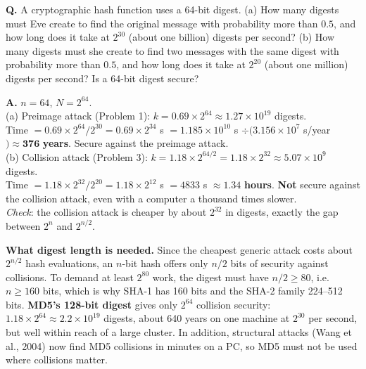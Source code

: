 \begin{worked}
\textbf{Q.} A cryptographic hash function uses a 64-bit digest. (a) How many digests must Eve create to find the original message with probability more than $0.5$, and how long does it take at $2^{30}$ (about one billion) digests per second? (b) How many digests must she create to find two messages with the same digest with probability more than $0.5$, and how long does it take at $2^{20}$ (about one million) digests per second? Is a 64-bit digest secure?

\textbf{A.} $n = 64$, $N = 2^{64}$.\\
(a) Preimage attack (Problem 1): $k = 0.69 \times 2^{64} \approx 1.27 \times 10^{19}$ digests.\\
Time $= 0.69 \times 2^{64} / 2^{30} = 0.69 \times 2^{34}$ s $= 1.185 \times 10^{10}$ s $\div (3.156 \times 10^{7}$ s/year$) \approx \mathbf{376}$ \textbf{years}. Secure against the preimage attack.\\
(b) Collision attack (Problem 3): $k = 1.18 \times 2^{64/2} = 1.18 \times 2^{32} \approx 5.07 \times 10^{9}$ digests.\\
Time $= 1.18 \times 2^{32} / 2^{20} = 1.18 \times 2^{12}$ s $= 4833$ s $\approx \mathbf{1.34}$ \textbf{hours}. \textbf{Not} secure against the collision attack, even with a computer a thousand times slower.\\
\emph{Check}: the collision attack is cheaper by about $2^{32}$ in digests, exactly the gap between $2^n$ and $2^{n/2}$.
\end{worked}

\textbf{What digest length is needed.} Since the cheapest generic attack costs about $2^{n/2}$ hash evaluations, an $n$-bit hash offers only $n/2$ bits of security against collisions. To demand at least $2^{80}$ work, the digest must have $n/2 \ge 80$, i.e.\ $n \ge 160$ bits, which is why SHA-1 has 160 bits and the SHA-2 family 224--512 bits. \textbf{MD5's 128-bit digest} gives only $2^{64}$ collision security: $1.18 \times 2^{64} \approx 2.2 \times 10^{19}$ digests, about 640 years on one machine at $2^{30}$ per second, but well within reach of a large cluster. In addition, structural attacks (Wang et al., 2004) now find MD5 collisions in minutes on a PC, so MD5 must not be used where collisions matter.

